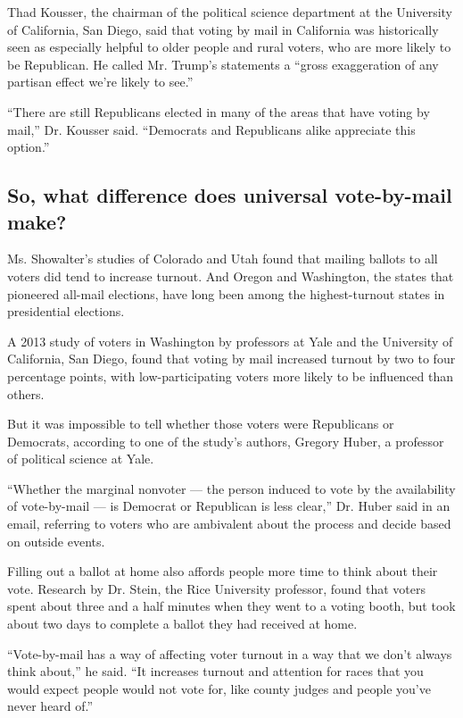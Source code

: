 Thad Kousser, the chairman of the political science department at the
University of California, San Diego, said that voting by mail in
California was historically seen as especially helpful to older people
and rural voters, who are more likely to be Republican. He called Mr.
Trump's statements a ``gross exaggeration of any partisan effect we're
likely to see.''

``There are still Republicans elected in many of the areas that have
voting by mail,'' Dr. Kousser said. ``Democrats and Republicans alike
appreciate this option.''

\hypertarget{so-what-difference-does-universal-vote-by-mail-make}{%
\subsection{So, what difference does universal vote-by-mail
make?}\label{so-what-difference-does-universal-vote-by-mail-make}}

Ms. Showalter's studies of Colorado and Utah found that mailing ballots
to all voters did tend to increase turnout. And Oregon and Washington,
the states that pioneered all-mail elections, have long been among the
highest-turnout states in presidential elections.

A 2013 study of voters in Washington by professors at Yale and the
University of California, San Diego, found that voting by mail increased
turnout by two to four percentage points, with low-participating voters
more likely to be influenced than others.

But it was impossible to tell whether those voters were Republicans or
Democrats, according to one of the study's authors, Gregory Huber, a
professor of political science at Yale.

``Whether the marginal nonvoter --- the person induced to vote by the
availability of vote-by-mail --- is Democrat or Republican is less
clear,'' Dr. Huber said in an email, referring to voters who are
ambivalent about the process and decide based on outside events.

Filling out a ballot at home also affords people more time to think
about their vote. Research by Dr. Stein, the Rice University professor,
found that voters spent about three and a half minutes when they went to
a voting booth, but took about two days to complete a ballot they had
received at home.

``Vote-by-mail has a way of affecting voter turnout in a way that we
don't always think about,'' he said. ``It increases turnout and
attention for races that you would expect people would not vote for,
like county judges and people you've never heard of.''

